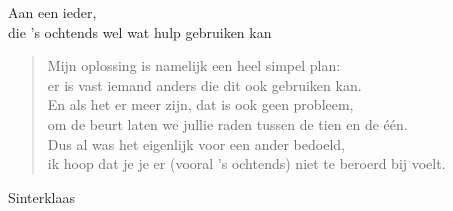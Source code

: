 \documentclass[12pt]{brief}
\begin{document}
\begin{letter}{Aan een ieder,\\
die 's ochtends wel wat hulp gebruiken kan}
\begin{verse}
Mijn oplossing is namelijk een heel simpel plan:\\
er is vast iemand anders die dit ook gebruiken kan.\\[0.5em]

En als het er meer zijn, dat is ook geen probleem,\\
om de beurt laten we jullie raden tussen de tien en de \'e\'en.\\[0.5em]


Dus al was het eigenlijk voor een ander bedoeld,\\
ik hoop dat je je er (vooral 's ochtends) niet te beroerd bij voelt.\\[2em]

\end{verse}


Sinterklaas


\closing{}

\end{letter}
\end{document}
